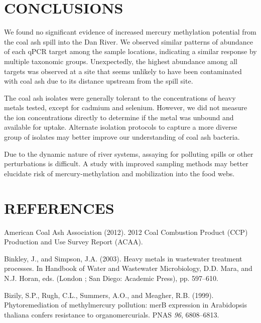 \documentclass[ms, hidelinks]{uncgdissertationexp}
\theoremstyle{plain}
\theoremstyle{definition}
\theoremstyle{remark}
\begin{document}
\hypertarget{conclusions}{%
\chapter{CONCLUSIONS}\label{conclusions}}

We found no significant evidence of increased mercury methylation potential from the coal ash spill into the Dan River. We observed similar patterns of abundance of each qPCR target among the sample locations, indicating a similar response by multiple taxonomic groups. Unexpectedly, the highest abundance among all targets was observed at a site that seems unlikely to have been contaminated with coal ash due to its distance upstream from the spill site.

The coal ash isolates were generally tolerant to the concentrations of heavy metals tested, except for cadmium and selenium. However, we did not measure the ion concentrations directly to determine if the metal was unbound and available for uptake. Alternate isolation protocols to capture a more diverse group of isolates may better improve our understanding of coal ash bacteria. 

Due to the dynamic nature of river systems, assaying for polluting spills or other perturbations is difficult. A study with  improved sampling methods may better elucidate risk of mercury-methylation and mobilization into the food webs.

\backmatter

\hypertarget{references}{%
\chapter{REFERENCES}\label{references}}

\noindent

\setlength{\parindent}{-0.20in}
\setlength{\leftskip}{0.20in}
\setlength{\parskip}{8pt}

\hypertarget{refs}{}
\leavevmode\hypertarget{ref-americancoalashassociation2012CoalCombustion2012}{}%
American Coal Ash Association (2012). 2012 Coal Combustion Product (CCP) Production and Use Survey Report (ACAA).

\leavevmode\hypertarget{ref-binkleyHeavyMetalsWastewater2003}{}%
Binkley, J., and Simpson, J.A. (2003). Heavy metals in wastewater treatment processes. In Handbook of Water and Wastewater Microbiology, D.D. Mara, and N.J. Horan, eds. (London ; San Diego: Academic Press), pp. 597--610.

\leavevmode\hypertarget{ref-bizilyPhytoremediationMethylmercuryPollution1999}{}%
Bizily, S.P., Rugh, C.L., Summers, A.O., and Meagher, R.B. (1999). Phytoremediation of methylmercury pollution: merB expression in Arabidopsis thaliana confers resistance to organomercurials. PNAS \emph{96}, 6808--6813.
\end{document}
